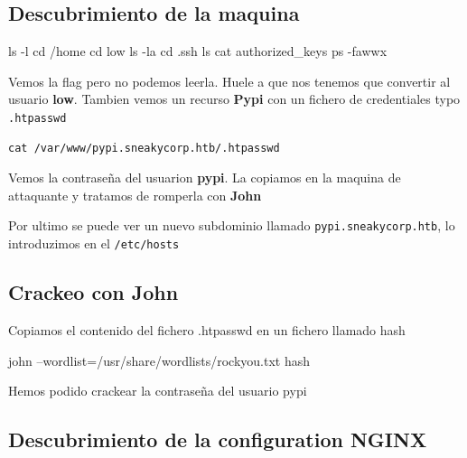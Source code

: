 \documentclass{assets/ipesethesis}
\newenvironment{Shaded}{\begin{snugshade}}{\end{snugshade}}
\newcommand{\BuiltInTok}[1]{#1}
\newcommand{\ExtensionTok}[1]{#1}
\newcommand{\FunctionTok}[1]{\textcolor[rgb]{0.00,0.00,0.00}{#1}}
\newcommand{\NormalTok}[1]{#1}
\begin{document}
\hypertarget{descubrimiento-de-la-maquina}{%
\subsection*{Descubrimiento de la maquina}\label{descubrimiento-de-la-maquina}}

\begin{Shaded}
\begin{Highlighting}[]
\FunctionTok{ls}\NormalTok{ -l}
\BuiltInTok{cd}\NormalTok{ /home}
\BuiltInTok{cd}\NormalTok{ low}
\FunctionTok{ls}\NormalTok{ -la}
\BuiltInTok{cd}\NormalTok{ .ssh}
\FunctionTok{ls}
\FunctionTok{cat}\NormalTok{ authorized_keys}
\FunctionTok{ps}\NormalTok{ -fawwx}
\end{Highlighting}
\end{Shaded}

Vemos la flag pero no podemos leerla. Huele a que nos tenemos que convertir al usuario \textbf{low}. Tambien vemos un recurso \textbf{Pypi} con
un fichero de credentiales typo \texttt{.htpasswd}

\begin{verbatim}
cat /var/www/pypi.sneakycorp.htb/.htpasswd
\end{verbatim}

Vemos la contraseña del usuarion \textbf{pypi}. La copiamos en la maquina de attaquante y tratamos de romperla con \textbf{John}

Por ultimo se puede ver un nuevo subdominio llamado \texttt{pypi.sneakycorp.htb}, lo introduzimos en el \texttt{/etc/hosts}

\hypertarget{crackeo-con-john-1}{%
\subsection*{Crackeo con John}\label{crackeo-con-john-1}}

Copiamos el contenido del fichero .htpasswd en un fichero llamado hash

\begin{Shaded}
\begin{Highlighting}[]
\ExtensionTok{john}\NormalTok{ --wordlist=/usr/share/wordlists/rockyou.txt hash}
\end{Highlighting}
\end{Shaded}

Hemos podido crackear la contraseña del usuario pypi

\hypertarget{descubrimiento-de-la-configuration-nginx}{%
\subsection*{Descubrimiento de la configuration NGINX}\label{descubrimiento-de-la-configuration-nginx}}
\end{document}
